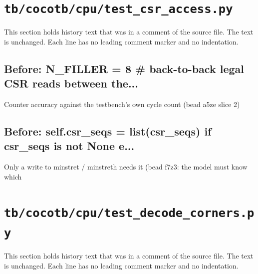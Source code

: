 \section{\texttt{tb/cocotb/cpu/test\_csr\_access.py}}\label{cr:suite:cpu-test-csr-access}

This section holds history text that was in a comment of the source file. The text is unchanged. Each line has no leading comment marker and no indentation.

\begin{record}

\subsection*{Before: N\_FILLER = 8  \# back-to-back legal CSR reads between the...}

\begin{textblock}
Counter accuracy against the testbench's own cycle count (bead a5ze slice 2)
\end{textblock}

\subsection*{Before: self.csr\_seqs = list(csr\_seqs) if csr\_seqs is not None e...}

\begin{textblock}
Only a write to minstret / minstreth needs it (bead f7z3: the model must know which
\end{textblock}

\end{record}

\section{\texttt{tb/cocotb/cpu/test\_decode\_corners.py}}\label{cr:suite:cpu-test-decode-corners}

This section holds history text that was in a comment of the source file. The text is unchanged. Each line has no leading comment marker and no indentation.

